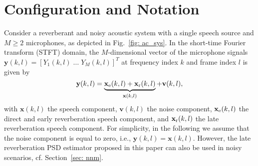 \documentclass{article}
\begin{document}
\section{Configuration and Notation}
\label{sec:intro}
Consider a reverberant and noisy acoustic system with a single speech source and $M \geq 2$ microphones, as depicted in Fig.~\ref{fig: ac_sys}.
In the short-time Fourier transform (STFT) domain, the $M$-dimensional vector of the microphone signals $\mathbf{y}(k,l) = [Y_1(k,l) \; \ldots \; Y_M(k,l)]^T$ at frequency index $k$ and frame index $l$ is given by
\begin{equation}
  \mathbf{y}(k,l)  = \underbrace{\mathbf{x}_{\rm e}(k,l) + \mathbf{x}_{\rm{r}}(k,l)}_{\mathbf{x}(k,l)} + \mathbf{v}(k,l),
\end{equation} 
with $\mathbf{x}(k,l)$ the speech component, $\mathbf{v}(k,l)$ the noise component, $\mathbf{x}_{\rm e}(k,l)$ the direct and early reverberation speech component, and $\mathbf{x}_{\rm r}(k,l)$ the late reverberation speech component.
For simplicity, in the following we assume that the noise component is equal to zero, i.e., $\mathbf{y}(k,l) = \mathbf{x}(k,l)$.
However, the late reverberation PSD estimator proposed in this paper can also be used in noisy scenarios, cf. Section~\ref{sec: nnm}.
\end{document}
